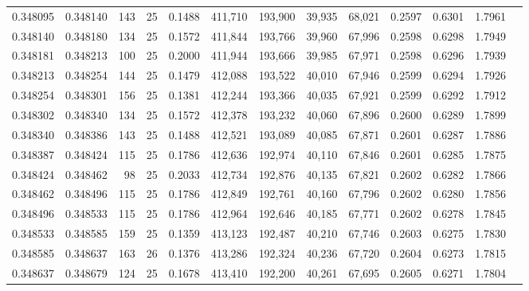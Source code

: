 \begin{tabular}{rrrrrrrrrrrrr}
0.348095 & 0.348140 &   143 &  25 &                                     0.1488 & 411,710 & 193,900 &  39,935 &  68,021 & 0.2597 & 0.6301 & 1.7961 \\
0.348140 & 0.348180 &   134 &  25 &                                     0.1572 & 411,844 & 193,766 &  39,960 &  67,996 & 0.2598 & 0.6298 & 1.7949 \\
0.348181 & 0.348213 &   100 &  25 &                                     0.2000 & 411,944 & 193,666 &  39,985 &  67,971 & 0.2598 & 0.6296 & 1.7939 \\
0.348213 & 0.348254 &   144 &  25 &                                     0.1479 & 412,088 & 193,522 &  40,010 &  67,946 & 0.2599 & 0.6294 & 1.7926 \\
0.348254 & 0.348301 &   156 &  25 &                                     0.1381 & 412,244 & 193,366 &  40,035 &  67,921 & 0.2599 & 0.6292 & 1.7912 \\
0.348302 & 0.348340 &   134 &  25 &                                     0.1572 & 412,378 & 193,232 &  40,060 &  67,896 & 0.2600 & 0.6289 & 1.7899 \\
0.348340 & 0.348386 &   143 &  25 &                                     0.1488 & 412,521 & 193,089 &  40,085 &  67,871 & 0.2601 & 0.6287 & 1.7886 \\
0.348387 & 0.348424 &   115 &  25 &                                     0.1786 & 412,636 & 192,974 &  40,110 &  67,846 & 0.2601 & 0.6285 & 1.7875 \\
0.348424 & 0.348462 &    98 &  25 &                                     0.2033 & 412,734 & 192,876 &  40,135 &  67,821 & 0.2602 & 0.6282 & 1.7866 \\
0.348462 & 0.348496 &   115 &  25 &                                     0.1786 & 412,849 & 192,761 &  40,160 &  67,796 & 0.2602 & 0.6280 & 1.7856 \\
0.348496 & 0.348533 &   115 &  25 &                                     0.1786 & 412,964 & 192,646 &  40,185 &  67,771 & 0.2602 & 0.6278 & 1.7845 \\
0.348533 & 0.348585 &   159 &  25 &                                     0.1359 & 413,123 & 192,487 &  40,210 &  67,746 & 0.2603 & 0.6275 & 1.7830 \\
0.348585 & 0.348637 &   163 &  26 &                                     0.1376 & 413,286 & 192,324 &  40,236 &  67,720 & 0.2604 & 0.6273 & 1.7815 \\
0.348637 & 0.348679 &   124 &  25 &                                     0.1678 & 413,410 & 192,200 &  40,261 &  67,695 & 0.2605 & 0.6271 & 1.7804 \\

\end{tabular}
